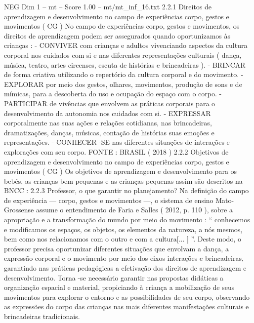 \begin{textsample}{NEG Dim 1 – mt – Score 1.00 – mt/mt\_inf\_16.txt}  \label{ex:f1_neg_211}
2.2.1 Direitos de aprendizagem e desenvolvimento no campo de experiências corpo, gestos e movimentos ( CG ) No campo de experiências corpo, gestos e movimentos, os direitos de aprendizagem podem ser assegurados quando oportunizamos às crianças : - CONVIVER com crianças e adultos vivenciando aspectos da cultura corporal nos cuidados com si e nas diferentes representações culturais ( dança, música, teatro, artes circenses, escuta de histórias e brincadeiras ). - BRINCAR de forma criativa utilizando o repertório da cultura corporal e do movimento. - EXPLORAR por meio dos gestos, olhares, movimentos, produção de sons e de mímicas, para a descoberta do uso e ocupação do espaço com o corpo. - PARTICIPAR de vivências que envolvem as práticas corporais para o desenvolvimento da autonomia nos cuidados com si. - EXPRESSAR corporalmente nas suas ações e relações cotidianas, nas brincadeiras, dramatizações, danças, músicas, contação de histórias suas emoções e representações. - CONHECER -SE nas diferentes situações de interações e explorações com seu corpo.
FONTE : BRASIL ( 2018 ) 2.2.2 Objetivos de aprendizagem e desenvolvimento no campo de experiências corpo, gestos e movimentos ( CG ) Os objetivos de aprendizagem e desenvolvimento para os bebês, as crianças bem pequenas e as crianças pequenas assim são descritos na BNCC : 2.2.3 Professor, o que garantir no planejamento?
Na definição do campo de experiência — corpo, gestos e movimentos —, o sistema de ensino Mato-Grossense assume o entendimento de Faria e Salles ( 2012, p. 110 ), sobre a apropriação e a transformação do mundo por meio do movimento : “ conhecemos e modificamos os espaços, os objetos, os elementos da natureza, a nós mesmos, bem como nos relacionamos com o outro e com a cultura[... ] ”.
Deste modo, o professor precisa oportunizar diferentes situações que envolvam a dança, a expressão corporal e o movimento por meio dos eixos interações e brincadeiras, garantindo nas práticas pedagógicas a efetivação dos direitos de aprendizagem e desenvolvimento.
Torna -se necessário garantir nas propostas didáticas a organização espacial e material, propiciando à criança a mobilização de seus movimentos para explorar o entorno e as possibilidades de seu corpo, observando as expressões do corpo das crianças nas mais diferentes manifestações culturais e brincadeiras tradicionais.

\end{textsample}
